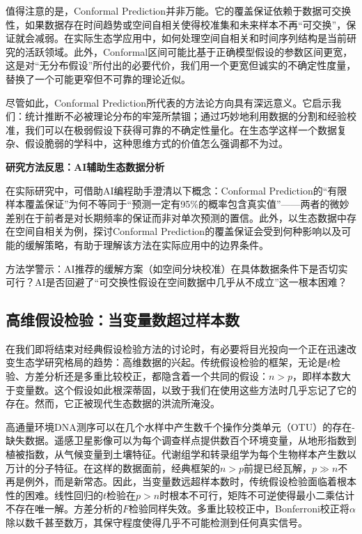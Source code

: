 \documentclass[
  twoside,12pt,fontset=none]{ctexbook}
\renewenvironment{quote}{%
  \def\FrameCommand{{\color{quote-border}\vrule width 4pt}\hspace{10pt}}%
  \MakeFramed {\advance\hsize-\width \FrameRestore\noindent\ignorespaces}%
}{%
  \endMakeFramed
}
\begin{document}
值得注意的是，Conformal Prediction并非万能。它的覆盖保证依赖于数据可交换性，如果数据存在时间趋势或空间自相关使得校准集和未来样本不再``可交换''，保证就会减弱。在实际生态学应用中，如何处理空间自相关和时间序列结构是当前研究的活跃领域。此外，Conformal区间可能比基于正确模型假设的参数区间更宽，这是对``无分布假设''所付出的必要代价，我们用一个更宽但诚实的不确定性度量，替换了一个可能更窄但不可靠的理论近似。

尽管如此，Conformal Prediction所代表的方法论方向具有深远意义。它启示我们：统计推断不必被理论分布的牢笼所禁锢；通过巧妙地利用数据的分割和经验校准，我们可以在极弱假设下获得可靠的不确定性量化。在生态学这样一个数据复杂、假设脆弱的学科中，这种思维方式的价值怎么强调都不为过。

\begin{quote}
\textbf{研究方法反思：AI辅助生态数据分析}

在实际研究中，可借助AI编程助手澄清以下概念：Conformal Prediction的``有限样本覆盖保证''为何不等同于``预测一定有95\%的概率包含真实值''------两者的微妙差别在于前者是对长期频率的保证而非对单次预测的置信。此外，以生态数据中存在空间自相关为例，探讨Conformal Prediction的覆盖保证会受到何种影响以及可能的缓解策略，有助于理解该方法在实际应用中的边界条件。

方法学警示：AI推荐的缓解方案（如空间分块校准）在具体数据条件下是否切实可行？AI是否回避了``可交换性假设在空间数据中几乎从不成立''这一根本困难？
\end{quote}

\hypertarget{ch06-highdim-testing}{%
\subsection{高维假设检验：当变量数超过样本数}\label{ch06-highdim-testing}}

在我们即将结束对经典假设检验方法的讨论时，有必要将目光投向一个正在迅速改变生态学研究格局的趋势：高维数据的兴起。传统假设检验的框架，无论是\(t\)检验、方差分析还是多重比较校正，都隐含着一个共同的假设：\(n > p\)，即样本数大于变量数。这个假设如此根深蒂固，以致于我们在使用这些方法时几乎忘记了它的存在。然而，它正被现代生态数据的洪流所淹没。

高通量环境DNA测序可以在几个水样中产生数千个操作分类单元（OTU）的存在-缺失数据。遥感卫星影像可以为每个调查样点提供数百个环境变量，从地形指数到植被指数，从气候变量到土壤特征。代谢组学和转录组学为每个生物样本产生数以万计的分子特征。在这样的数据面前，经典框架的\(n > p\)前提已经瓦解，\(p \gg n\)不再是例外，而是新常态。因此，当变量数远超样本数时，传统假设检验面临着根本性的困难。线性回归的\(t\)检验在\(p > n\)时根本不可行，矩阵不可逆使得最小二乘估计不存在唯一解。方差分析的\(F\)检验同样失效。多重比较校正中，Bonferroni校正将\(\alpha\)除以数千甚至数万，其保守程度使得几乎不可能检测到任何真实信号。
\end{document}

